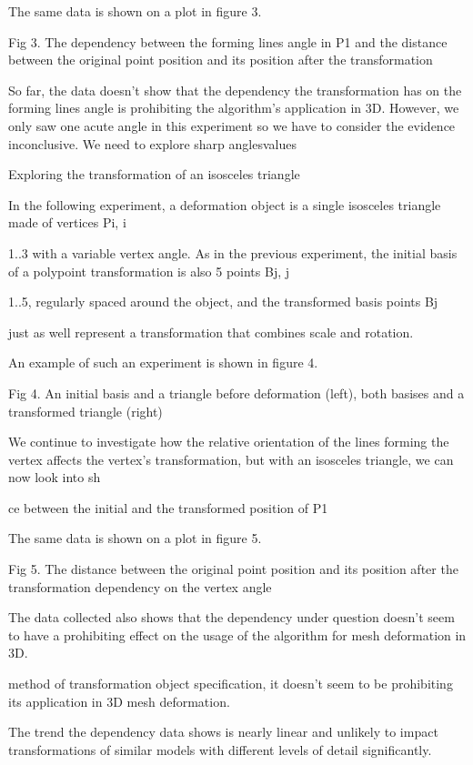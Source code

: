 \documentclass[12pt,a4paper]{article}
\begin{document}
\par
The same data is shown on a plot in figure 3.
\par
Fig 3. The dependency between the forming lines angle in P1 and the distance between the original point position and its position after the transformation
\par
So far, the data doesn’t show that the dependency the transformation has on the forming lines angle is prohibiting the algorithm's application in 3D. However, we only saw one acute angle in this experiment so we have to consider the evidence inconclusive. We need to explore sharp anglesvalues
\par
Exploring the transformation of an isosceles triangle
\par
In the following experiment, a deformation object is a single isosceles triangle made of vertices Pi, i
\par
1..3 with a variable vertex angle. As in the previous experiment, the initial basis of a polypoint transformation is also 5 points Bj, j
\par
1..5, regularly spaced around the object, and the transformed basis points Bj
\par
just as well represent a transformation that combines scale and rotation.
\par
An example of such an experiment is shown in figure 4.
\par
Fig 4. An initial basis and a triangle before deformation (left), both basises and a transformed triangle (right)
\par
We continue to investigate how the relative orientation of the lines forming the vertex affects the vertex’s transformation, but with an isosceles triangle, we can now look into sh
\par
ce between the initial and the transformed position of P1
\par
The same data is shown on a plot in figure 5.
\par
Fig 5. The distance between the original point position and its position after the transformation dependency on the vertex angle
\par
The data collected also shows that the dependency under question doesn’t seem to have a prohibiting effect on the usage of the algorithm for mesh deformation in 3D.
\par
method of transformation object specification, it doesn’t seem to be prohibiting its application in 3D mesh deformation.
\par
The trend the dependency data shows is nearly linear and unlikely to impact transformations of similar models with different levels of detail significantly.
\end{document}
